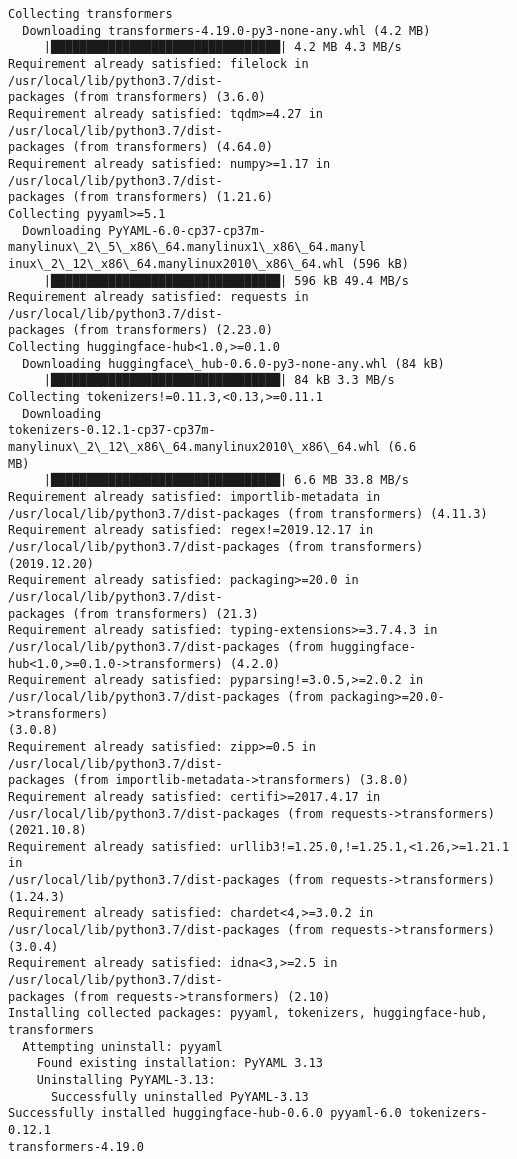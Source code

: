 \documentclass[11pt]{article}
\begin{document}
    \begin{Verbatim}[commandchars=\\\{\}]
Collecting transformers
  Downloading transformers-4.19.0-py3-none-any.whl (4.2 MB)
     |████████████████████████████████| 4.2 MB 4.3 MB/s
Requirement already satisfied: filelock in /usr/local/lib/python3.7/dist-
packages (from transformers) (3.6.0)
Requirement already satisfied: tqdm>=4.27 in /usr/local/lib/python3.7/dist-
packages (from transformers) (4.64.0)
Requirement already satisfied: numpy>=1.17 in /usr/local/lib/python3.7/dist-
packages (from transformers) (1.21.6)
Collecting pyyaml>=5.1
  Downloading PyYAML-6.0-cp37-cp37m-manylinux\_2\_5\_x86\_64.manylinux1\_x86\_64.manyl
inux\_2\_12\_x86\_64.manylinux2010\_x86\_64.whl (596 kB)
     |████████████████████████████████| 596 kB 49.4 MB/s
Requirement already satisfied: requests in /usr/local/lib/python3.7/dist-
packages (from transformers) (2.23.0)
Collecting huggingface-hub<1.0,>=0.1.0
  Downloading huggingface\_hub-0.6.0-py3-none-any.whl (84 kB)
     |████████████████████████████████| 84 kB 3.3 MB/s
Collecting tokenizers!=0.11.3,<0.13,>=0.11.1
  Downloading
tokenizers-0.12.1-cp37-cp37m-manylinux\_2\_12\_x86\_64.manylinux2010\_x86\_64.whl (6.6
MB)
     |████████████████████████████████| 6.6 MB 33.8 MB/s
Requirement already satisfied: importlib-metadata in
/usr/local/lib/python3.7/dist-packages (from transformers) (4.11.3)
Requirement already satisfied: regex!=2019.12.17 in
/usr/local/lib/python3.7/dist-packages (from transformers) (2019.12.20)
Requirement already satisfied: packaging>=20.0 in /usr/local/lib/python3.7/dist-
packages (from transformers) (21.3)
Requirement already satisfied: typing-extensions>=3.7.4.3 in
/usr/local/lib/python3.7/dist-packages (from huggingface-
hub<1.0,>=0.1.0->transformers) (4.2.0)
Requirement already satisfied: pyparsing!=3.0.5,>=2.0.2 in
/usr/local/lib/python3.7/dist-packages (from packaging>=20.0->transformers)
(3.0.8)
Requirement already satisfied: zipp>=0.5 in /usr/local/lib/python3.7/dist-
packages (from importlib-metadata->transformers) (3.8.0)
Requirement already satisfied: certifi>=2017.4.17 in
/usr/local/lib/python3.7/dist-packages (from requests->transformers) (2021.10.8)
Requirement already satisfied: urllib3!=1.25.0,!=1.25.1,<1.26,>=1.21.1 in
/usr/local/lib/python3.7/dist-packages (from requests->transformers) (1.24.3)
Requirement already satisfied: chardet<4,>=3.0.2 in
/usr/local/lib/python3.7/dist-packages (from requests->transformers) (3.0.4)
Requirement already satisfied: idna<3,>=2.5 in /usr/local/lib/python3.7/dist-
packages (from requests->transformers) (2.10)
Installing collected packages: pyyaml, tokenizers, huggingface-hub, transformers
  Attempting uninstall: pyyaml
    Found existing installation: PyYAML 3.13
    Uninstalling PyYAML-3.13:
      Successfully uninstalled PyYAML-3.13
Successfully installed huggingface-hub-0.6.0 pyyaml-6.0 tokenizers-0.12.1
transformers-4.19.0
    \end{Verbatim}
\end{document}
